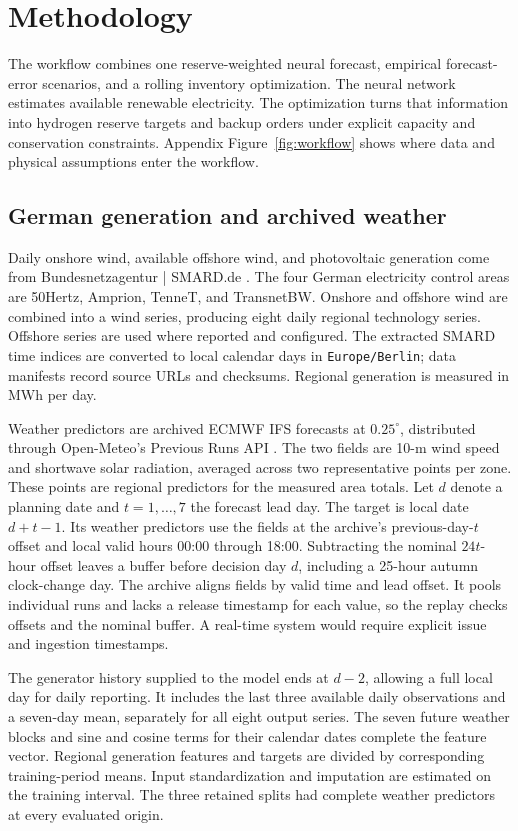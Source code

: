 \section{Methodology}
\label{sec:method}
The workflow combines one reserve-weighted neural forecast, empirical forecast-error scenarios, and a rolling inventory optimization. The neural network estimates available renewable electricity. The optimization turns that information into hydrogen reserve targets and backup orders under explicit capacity and conservation constraints. Appendix Figure~\ref{fig:workflow} shows where data and physical assumptions enter the workflow.

\subsection{German generation and archived weather}
\label{sec:data}
Daily onshore wind, available offshore wind, and photovoltaic generation come from Bundesnetzagentur | SMARD.de \citep{smard}. The four German electricity control areas are 50Hertz, Amprion, TenneT, and TransnetBW. Onshore and offshore wind are combined into a wind series, producing eight daily regional technology series. Offshore series are used where reported and configured. The extracted SMARD time indices are converted to local calendar days in \texttt{Europe/Berlin}; data manifests record source URLs and checksums. Regional generation is measured in MWh per day.

Weather predictors are archived ECMWF IFS forecasts at $0.25^\circ$, distributed through Open-Meteo's Previous Runs API \citep{meteo}. The two fields are 10-m wind speed and shortwave solar radiation, averaged across two representative points per zone. These points are regional predictors for the measured area totals. Let $d$ denote a planning date and $t=1,\ldots,7$ the forecast lead day. The target is local date $d+t-1$. Its weather predictors use the fields at the archive's previous-day-$t$ offset and local valid hours 00:00 through 18:00. Subtracting the nominal $24t$-hour offset leaves a buffer before decision day $d$, including a 25-hour autumn clock-change day. The archive aligns fields by valid time and lead offset. It pools individual runs and lacks a release timestamp for each value, so the replay checks offsets and the nominal buffer. A real-time system would require explicit issue and ingestion timestamps.

The generator history supplied to the model ends at $d-2$, allowing a full local day for daily reporting. It includes the last three available daily observations and a seven-day mean, separately for all eight output series. The seven future weather blocks and sine and cosine terms for their calendar dates complete the feature vector. Regional generation features and targets are divided by corresponding training-period means. Input standardization and imputation are estimated on the training interval. The three retained splits had complete weather predictors at every evaluated origin.

